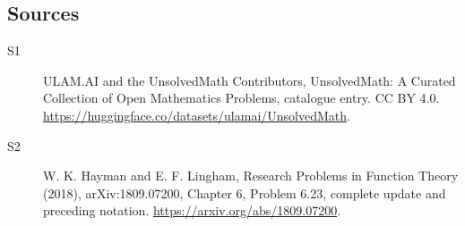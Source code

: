 \documentclass[11pt]{article}
\begin{document}
\subsection{Sources}
\begin{description}
\item[\hypertarget{source:statement:1}{S1}] ULAM.AI and the UnsolvedMath Contributors, UnsolvedMath: A Curated Collection of Open Mathematics Problems, catalogue entry. CC BY 4.0. \url{https://huggingface.co/datasets/ulamai/UnsolvedMath}.
\item[\hypertarget{source:statement:2}{S2}] W. K. Hayman and E. F. Lingham, Research Problems in Function Theory (2018), arXiv:1809.07200, Chapter 6, Problem 6.23, complete update and preceding notation. \url{https://arxiv.org/abs/1809.07200}.
\end{description}
\label{end:statement}
\end{document}
